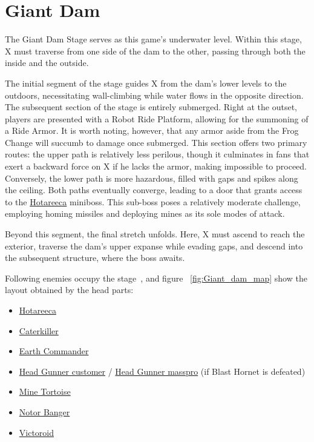 \section{Giant Dam}
The Giant Dam Stage serves as this game's underwater level. Within this stage, X must traverse from one side of the dam to the other, passing through both the inside and the outside.

The initial segment of the stage guides X from the dam's lower levels to the outdoors, necessitating wall-climbing while water flows in the opposite direction.
The subsequent section of the stage is entirely submerged. Right at the outset, players are presented with a Robot Ride Platform, allowing for the summoning of a Ride Armor. It is worth noting, however, that any armor aside from the Frog Change will succumb to damage once submerged. This section offers two primary routes: the upper path is relatively less perilous, though it culminates in fans that exert a backward force on X if he lacks the armor, making impossible to proceed. Conversely, the lower path is more hazardous, filled with gaps and spikes along the ceiling. Both paths eventually converge, leading to a door that grants access to the \hyperlink{miniboss:Hotareeca}{Hotareeca} miniboss. This sub-boss poses a relatively moderate challenge, employing homing missiles and deploying mines as its sole modes of attack.

Beyond this segment, the final stretch unfolds. Here, X must ascend to reach the exterior, traverse the dam's upper expanse while evading gaps, and descend into the subsequent structure, where the boss awaits.

Following enemies occupy the stage~\cite{wiki:Giant_Dam}, and figure ~\ref{fig:Giant_dam_map} show the layout obtained by the head parts:
\begin{itemize}
	
\item \hyperlink{miniboss:Hotareeca}{Hotareeca}
\item \hyperlink{enem:Caterkiller}{Caterkiller}
\item \hyperlink{enem:Earth_Commander}{Earth Commander}
\item \hyperlink{enem:Head_Gunner_customer}{Head Gunner customer} / \hyperlink{enem:Head_Gunner_masspro}{Head Gunner masspro} (if Blast Hornet is defeated) 
\item \hyperlink{enem:Mine_Tortoise}{Mine Tortoise}
\item \hyperlink{enem:Notor_Banger}{Notor Banger}
\item \hyperlink{enem:Victoroid}{Victoroid}
\end{itemize}


